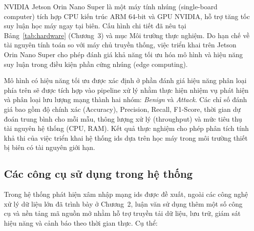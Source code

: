 NVIDIA Jetson Orin Nano Super là một máy tính nhúng (single-board computer) tích hợp CPU kiến trúc ARM 64-bit và GPU NVIDIA, hỗ trợ tăng tốc suy luận học máy ngay tại biên. Cấu hình chi tiết đã nêu tại Bảng~\ref{tab:hardware} (Chương~3) và mục Môi trường thực nghiệm. Do hạn chế về tài nguyên tính toán so với máy chủ truyền thống, việc triển khai trên Jetson Orin Nano Super cho phép đánh giá khả năng tối ưu hóa mô hình và hiệu năng suy luận trong điều kiện phần cứng nhúng (edge computing).

Mô hình có hiệu năng tối ưu được xác định ở phần đánh giá hiệu năng phân loại phía trên sẽ được tích hợp vào pipeline xử lý nhằm thực hiện nhiệm vụ phát hiện và phân loại lưu lượng mạng thành hai nhóm: \textit{Benign} và \textit{Attack}. Các chỉ số đánh giá bao gồm độ chính xác (Accuracy), Precision, Recall, F1-Score, thời gian dự đoán trung bình cho mỗi mẫu, thông lượng xử lý (throughput) và mức tiêu thụ tài nguyên hệ thống (CPU, RAM). Kết quả thực nghiệm cho phép phân tích tính khả thi của việc triển khai hệ thống \ac{ids} dựa trên học máy trong môi trường thiết bị biên có tài nguyên giới hạn.

\subsection{Các công cụ sử dụng trong hệ thống}

Trong hệ thống phát hiện xâm nhập mạng \ac{ids} được đề xuất, ngoài các công nghệ xử lý dữ liệu lớn đã trình bày ở Chương~2, luận văn sử dụng thêm một số công cụ và nền tảng mã nguồn mở nhằm hỗ trợ truyền tải dữ liệu, lưu trữ, giám sát hiệu năng và cảnh báo theo thời gian thực. Cụ thể:

